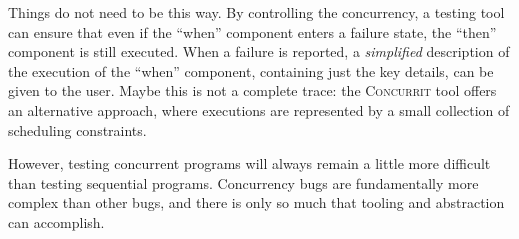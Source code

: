 Things do not need to be this way.  By controlling the concurrency, a
testing tool can ensure that even if the ``when'' component enters a
failure state, the ``then'' component is still executed.  When a
failure is reported, a \emph{simplified} description of the execution
of the ``when'' component, containing just the key details, can be
given to the user.  Maybe this is not a complete trace: the
\textsc{Concurrit}\cite{elmas2013} tool offers an alternative
approach, where executions are represented by a small collection of
scheduling constraints.

However, testing concurrent programs will always remain a little more
difficult than testing sequential programs.  Concurrency bugs are
fundamentally more complex than other bugs, and there is only so much
that tooling and abstraction can accomplish.
